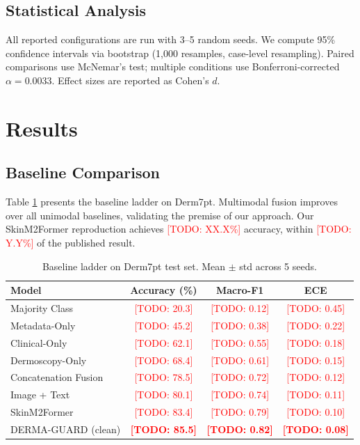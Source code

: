 \documentclass[conference]{IEEEtran}
\newcommand{\todo}[1]{\textcolor{red}{[TODO: #1]}}
\begin{document}
\subsection{Statistical Analysis}

All reported configurations are run with 3--5 random seeds. We compute 95\% confidence intervals via bootstrap (1,000 resamples, case-level resampling). Paired comparisons use McNemar's test; multiple conditions use Bonferroni-corrected $\alpha = 0.0033$. Effect sizes are reported as Cohen's $d$.

\section{Results}
\label{sec:results}

\subsection{Baseline Comparison}

Table \ref{tab:baseline} presents the baseline ladder on Derm7pt. Multimodal fusion improves over all unimodal baselines, validating the premise of our approach. Our SkinM2Former reproduction achieves \todo{XX.X\%} accuracy, within \todo{Y.Y\%} of the published result.

\begin{table}[t]
\caption{Baseline ladder on Derm7pt test set. Mean $\pm$ std across 5 seeds.}
\label{tab:baseline}
\centering
\begin{tabular}{@{}lccc@{}}
\toprule
\textbf{Model} & \textbf{Accuracy (\%)} & \textbf{Macro-F1} & \textbf{ECE} \\
\midrule
Majority Class & \todo{20.3} & \todo{0.12} & \todo{0.45} \\
Metadata-Only & \todo{45.2} & \todo{0.38} & \todo{0.22} \\
Clinical-Only & \todo{62.1} & \todo{0.55} & \todo{0.18} \\
Dermoscopy-Only & \todo{68.4} & \todo{0.61} & \todo{0.15} \\
Concatenation Fusion & \todo{78.5} & \todo{0.72} & \todo{0.12} \\
Image + Text & \todo{80.1} & \todo{0.74} & \todo{0.11} \\
SkinM2Former \cite{zhang2025} & \todo{83.4} & \todo{0.79} & \todo{0.10} \\
\midrule
DERMA-GUARD (clean) & \textbf{\todo{85.5}} & \textbf{\todo{0.82}} & \textbf{\todo{0.08}} \\
\bottomrule
\end{tabular}
\end{table}
\end{document}
